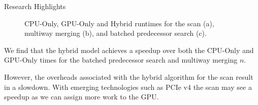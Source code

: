 \documentclass[final]{beamer}
\newlength{\colwidth}
\begin{document}
\begin{frame}[t]
\begin{columns}[t]
\begin{column}{\colwidth}
\begin{block}{Research Highlights}
 \begin{figure}[htp]
\centering
{}
   \caption{CPU-Only, GPU-Only and Hybrid runtimes for the scan (a), multiway merging (b), and batched predecessor search (c).}
   \label{fig:predecessor_search_results}
\end{figure}

\end{block} 
\begin{description}[font=$\bullet$~\normalfont\scshape\color{red!50!black}]
\item We find that the hybrid model achieves a speedup over both the CPU-Only and GPU-Only times for the batched predecessor search and multiway merging $n$. 
\item However, the overheads associated with the hybrid algorithm for the scan result in a slowdown. With emerging technologies such as PCIe v4 the scan may see
  a speedup as we can assign more work to the GPU.
\end{description}



\end{column}
\end{columns}
\end{frame}
\end{document}
